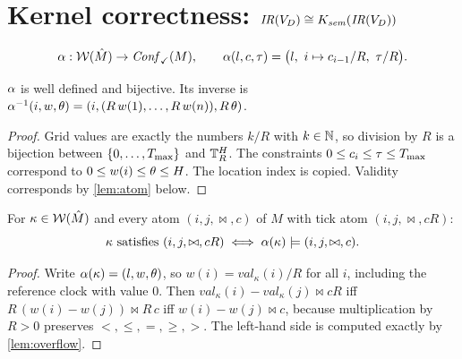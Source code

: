 \section{Kernel correctness: $\mathit{IR}(V_D)\cong K_{\mathit{sem}}(\mathit{IR}(V_D))$}\label{sec:iso}

\begin{definition}\label{def:alpha}
\[
  \abs:\W(\hat M)\to\Valid(M),\qquad
  \abs(l,c,\tau)=\bigl(l,\ i\mapsto c_{i-1}/R,\ \tau/R\bigr).
\]
\end{definition}

\begin{lemma}\label{lem:alpha}
$\alpha$ is well defined and bijective. Its inverse is
$\alpha^{-1}(i,w,\theta)=(i,(R\,w(1),\dots,R\,w(n)),R\,\theta)$.
\end{lemma}
\begin{proof}
Grid values are exactly the numbers $k/R$ with $k\in\mathbb{N}$, so division by $R$ is a
bijection between $\{0,\dots,T_{\max}\}$ and $\mathbb{T}_R^{H}$. The constraints
$0\le c_i\le\tau\le T_{\max}$ correspond to $0\le w(i)\le\theta\le H$. The location index is
copied. Validity corresponds by \cref{lem:atom} below.
\end{proof}

\begin{lemma}\label{lem:atom}
For $\kappa\in\mathcal{W}(\hat M)$ and every atom $(i,j,\bowtie,c)$ of $M$ with tick atom
$(i,j,\bowtie,cR)$:
\[
  \kappa \text{ satisfies } (i,j,\bowtie,cR) \iff \alpha(\kappa)\models(i,j,\bowtie,c).
\]
\end{lemma}
\begin{proof}
Write $\alpha(\kappa)=(l,w,\theta)$, so $w(i)=\mathit{val}_\kappa(i)/R$ for all $i$, including the
reference clock with value $0$. Then $\mathit{val}_\kappa(i)-\mathit{val}_\kappa(j)\bowtie cR$ iff
$R\,(w(i)-w(j))\bowtie R\,c$ iff $w(i)-w(j)\bowtie c$, because multiplication by $R>0$
preserves $<,\le,=,\ge,>$. The left-hand side is computed exactly by \cref{lem:overflow}.
\end{proof}

